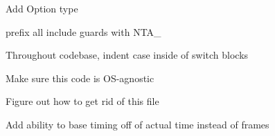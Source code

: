
\begin{DoxyRefList}
\item[\label{todo__todo000002}%
\Hypertarget{todo__todo000002}%
Namespace \hyperlink{namespacenta}{nta} ]Add Option type 

prefix all include guards with N\+T\+A\+\_\+ 

Throughout codebase, indent {\ttfamily case} inside of {\ttfamily switch} blocks 

Make sure this code is O\+S-\/agnostic 

Figure out how to get rid of this file  
\item[\label{todo__todo000001}%
\Hypertarget{todo__todo000001}%
Class \hyperlink{classnta_1_1CallbackManager}{nta\+:\+:Callback\+Manager} ]Add ability to base timing off of actual time instead of frames 


\end{DoxyRefList}
